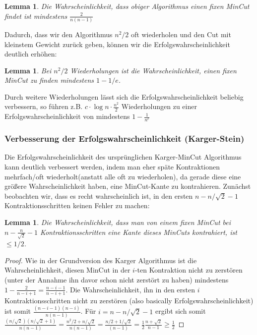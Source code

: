 \documentclass{article}
\newtheorem{lem}[thm]{Lemma}
\begin{document}
\begin{lem}
	Die Wahrscheinlichkeit, dass obiger Algorithmus einen fixen MinCut findet ist mindestens $\frac{2}{n(n-1)}$
\end{lem}

Dadurch, dass wir den Algorithmus $n^2/2$ oft wiederholen und den Cut mit kleinstem Gewicht zurück geben, können wir die Erfolgswahrscheinlichkeit deutlich erhöhen:

\begin{lem}
	Bei $n^2/2$ Wiederholungen ist die Wahrscheinlichkeit, einen fixen MinCut zu finden mindestens $1-1/e$.
\end{lem}

Durch weitere Wiederholungen lässt sich die Erfolgswahrscheinlichkeit beliebig verbessern, so führen z.B. $c\cdot \log n  \cdot \frac{n^2}{2}$ Wiederholungen zu einer Erfolgswahrscheinlichkeit von mindestens $1-\frac{1}{n^c}$

\subsubsection{Verbesserung der Erfolgswahrscheinlichkeit (Karger-Stein)}
Die Erfolgswahrscheinlichkeit des ursprünglichen Karger-MinCut Algorithmus kann deutlich verbessert werden, indem man eher späte Kontraktionen mehrfach/oft wiederholt(anstatt alle oft zu wiederholen), da gerade diese eine größere Wahrscheinlichkeit haben, eine MinCut-Kante zu kontrahieren. Zunächst beobachten wir, dass es recht wahrscheinlich ist, in den ersten $n-n/\sqrt{2}-1$ Kontraktionsschritten keinen Fehler zu machen:

\begin{lem}
	Die Wahrscheinlichkeit, dass man von einem fixen MinCut bei  $n- \frac{n}{\sqrt{2} }-1$ Kontraktionsschritten eine Kante dieses MinCuts kontrahiert, ist $\leq 1/2$.
\end{lem}
\begin{proof}
	Wie in der Grundversion des Karger Algorithmus ist die Wahrscheinlichkeit, diesen MinCut in der $i$-ten Kontraktion nicht zu zerstören (unter der Annahme ihn davor schon nicht zerstört zu haben) mindestens $1-\frac{2}{n-i+1}=\frac{n-i-1}{n-i+1}$. Die Wahrscheinlichkeit, ihn in den ersten $i$ Kontraktionsschritten nicht zu zerstören (also basically Erfolgswahrscheinlichkeit) ist somit $\frac{(n-i-1)(n-i)}{n(n-1)}$.
	Für $i=n-n/\sqrt{2}-1$ ergibt sich somit $\frac{(n/\sqrt{2})(n/\sqrt{2}+1)}{n(n-1)}=\frac{n^2/2+n/\sqrt{2}}{n(n-1)}=\frac{n/2+1/\sqrt{2}}{(n-1)}=\frac{1}{2}\frac{n+\sqrt{2}}{n-1}\geq \frac{1}{2}$
\end{proof}
\end{document}

